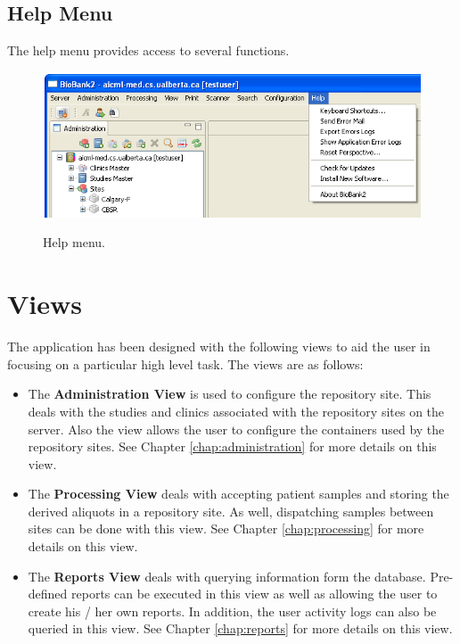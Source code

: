 \subsection{Help Menu}
The help menu provides access to several functions.
    \begin{figure}[H]
      \centering
      \scalebox{0.5}
      { \includegraphics*{screenshots/overview/main_menu_help} }
      \caption{Help menu.}
      \label{fig:main_menu_help}
    \end{figure}

\section{Views}
\label{sec:application_views}

The application has been designed with the following views to aid the user in
focusing on a particular high level task. The views are as follows:
\begin{itemize}
  \item The \textbf{Administration View} is used to configure the repository
    site. This deals with the studies and clinics associated with the
    repository sites on the server. Also the view allows the user to configure
    the containers used by the repository sites. See Chapter
    \ref{chap:administration} for more details on this view.
  \item The \textbf{Processing View} deals with accepting patient samples and
    storing the derived aliquots in a repository site. As well, dispatching
    samples between sites can be done with this view. See Chapter
    \ref{chap:processing} for more details on this view.
  \item The \textbf{Reports View} deals with querying information form the
    database. Pre-defined reports can be executed in this view as well as
    allowing the user to create his / her own reports. In addition, the user
    activity logs can also be queried in this view.  See Chapter
    \ref{chap:reports} for more details on this view.
\end{itemize}
